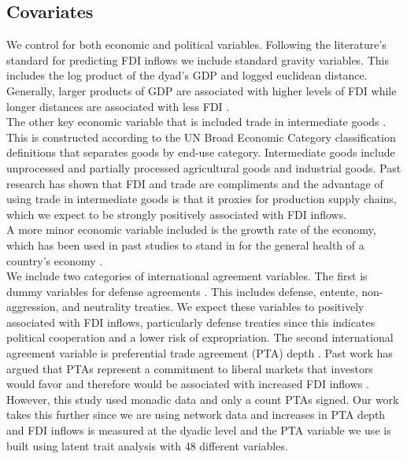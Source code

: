 \documentclass{article}
\begin{document}
\subsection{Covariates}

We control for both economic and political variables. Following the literature's standard for predicting FDI inflows we include standard gravity variables. This includes the log product of the dyad's GDP and logged euclidean distance. Generally, larger products of GDP are associated with higher levels of FDI while longer distances are associated with less FDI \citep{mayer2011notes, WB1}. \\

The other key economic variable that is included trade in intermediate goods \citep{OECD}. This is constructed according to the UN Broad Economic Category classification definitions that separates goods by end-use category. Intermediate goods include unprocessed and partially processed agricultural goods and industrial goods. Past research has shown that FDI and trade are compliments \citep{aizenman2006fdi} and the advantage of using trade in intermediate goods is that it proxies for production supply chains, which we expect to be strongly positively associated with FDI inflows.\\

A more minor economic variable included is the growth rate of the economy, which has been used in past studies to stand in for the general health of a country's economy \citep{WB2}.\\

We include two categories of international agreement variables. The first is dummy variables for defense agreements \citep{Gibler09}. This includes defense, entente, non-aggression, and neutrality treaties. We expect these variables to positively associated with FDI inflows, particularly defense treaties since this indicates political cooperation and a lower risk of expropriation. The second international agreement variable is preferential trade agreement (PTA) depth \citep{dur2014design}. Past work has argued that PTAs represent a commitment to liberal markets that investors would favor and therefore would be associated with increased FDI inflows \citep{buthe2014foreign}. However, this study used monadic data and only a count PTAs signed. Our work takes this further since we are using network data and increases in PTA depth and FDI inflows is measured at the dyadic level and the PTA variable we use is built using latent trait analysis with 48 different variables.\\
\end{document}
